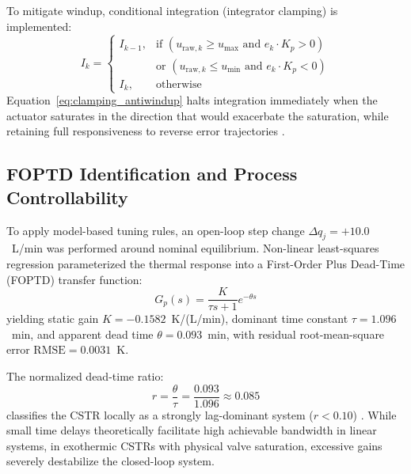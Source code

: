 To mitigate windup, conditional integration (integrator clamping) is implemented:
\begin{equation}
    I_k = \begin{cases}
        I_{k-1}, & \text{if } (u_{\text{raw}, k} \ge u_{\max} \text{ and } e_k \cdot K_p > 0) \\
                 & \text{or } (u_{\text{raw}, k} \le u_{\min} \text{ and } e_k \cdot K_p < 0) \\
        I_k,     & \text{otherwise}
    \end{cases}
    \label{eq:clamping_antiwindup}
\end{equation}
Equation~\eqref{eq:clamping_antiwindup} halts integration immediately when the actuator saturates in the direction that would exacerbate the saturation, while retaining full responsiveness to reverse error trajectories \cite{bohn1995analysis, peng1996nonlinear}.

\subsection{FOPTD Identification and Process Controllability}
To apply model-based tuning rules, an open-loop step change $\Delta q_j = +10.0$~L/min was performed around nominal equilibrium. Non-linear least-squares regression parameterized the thermal response into a First-Order Plus Dead-Time (FOPTD) transfer function:
\begin{equation}
    G_p(s) = \frac{K}{\tau s + 1} e^{-\theta s}
    \label{eq:foptd}
\end{equation}
yielding static gain $K = -0.1582$~K/(L/min), dominant time constant $\tau = 1.096$~min, and apparent dead time $\theta = 0.093$~min, with residual root-mean-square error $\text{RMSE} = 0.0031$~K.

The normalized dead-time ratio:
\begin{equation}
    r = \frac{\theta}{\tau} = \frac{0.093}{1.096} \approx 0.085
    \label{eq:controllability_ratio}
\end{equation}
classifies the CSTR locally as a strongly lag-dominant system ($r < 0.10$) \cite{shinskey1996process, odwyer2009handbook}. While small time delays theoretically facilitate high achievable bandwidth in linear systems, in exothermic CSTRs with physical valve saturation, excessive gains severely destabilize the closed-loop system.


